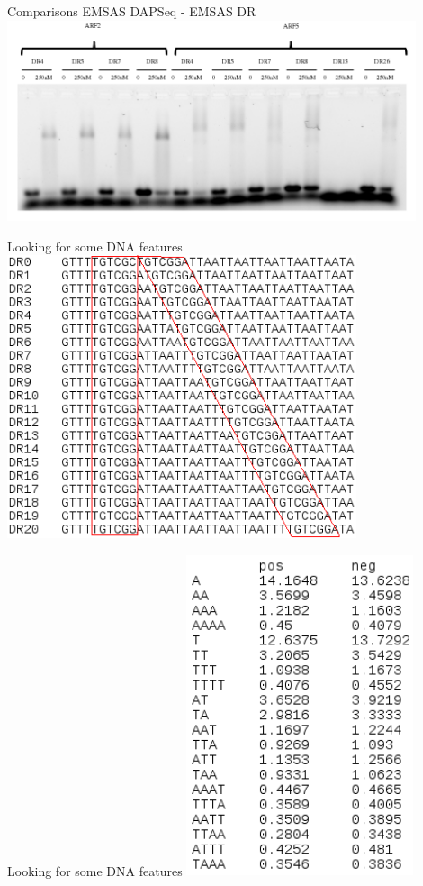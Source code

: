\documentclass{beamer}
\begin{document}
\begin{frame}{Comparisons EMSAS DAPSeq - EMSAS DR}
  \includegraphics[width=0.9\textwidth,height=0.8\textheight,center]{EMSA_DR.png}
\end{frame}

\begin{frame}{Looking for some DNA features}
  \includegraphics[width=0.77\textwidth,height=0.7\textheight,center]{tableau_DR.png}
\end{frame}

\begin{frame}{Looking for some DNA features}
  \includegraphics[width=0.5\textwidth,height=0.6\textheight,center]{A_and_T_rate.png}
\end{frame}
\end{document}
